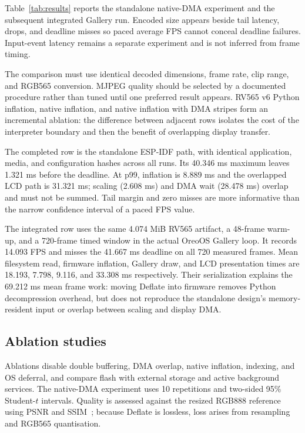 \documentclass[11pt,twocolumn]{article}
\begin{document}
Table~\ref{tab:results} reports the standalone native-DMA experiment and the
subsequent integrated Gallery run.  Encoded size appears beside tail latency,
drops, and deadline misses so paced average FPS cannot conceal deadline
failures.  Input-event latency remains a separate experiment and is not
inferred from frame timing.

The comparison must use identical decoded dimensions, frame rate, clip range,
and RGB565 conversion.  MJPEG quality should be selected by a documented
procedure rather than tuned until one preferred result appears.  RV565 v6
Python inflation, native inflation, and native inflation with DMA stripes form
an incremental ablation: the difference between adjacent rows isolates the
cost of the interpreter boundary and then the benefit of overlapping display
transfer.

The completed row is the standalone ESP-IDF path, with identical application,
media, and configuration hashes across all runs.  Its 40.346 ms maximum leaves
1.321 ms before the deadline.  At p99, inflation is 8.889 ms and the overlapped
LCD path is 31.321 ms; scaling (2.608 ms) and DMA wait (28.478 ms) overlap and
must not be summed.  Tail margin and zero misses are more informative than the
narrow confidence interval of a paced FPS value.

The integrated row uses the same 4.074 MiB RV565 artifact, a 48-frame warm-up,
and a 720-frame timed window in the actual OreoOS Gallery loop.  It records
14.093 FPS and misses the 41.667 ms deadline on all 720 measured frames.  Mean
filesystem read, firmware inflation, Gallery draw, and LCD presentation times
are 18.193, 7.798, 9.116, and 33.308 ms respectively.  Their serialization
explains the 69.212 ms mean frame work: moving Deflate into firmware removes
Python decompression overhead, but does not reproduce the standalone design's
memory-resident input or overlap between scaling and display DMA.

\subsection{Ablation studies}

Ablations disable double buffering, DMA overlap, native inflation, indexing,
and OS deferral, and compare flash with external storage and active background
services.  The native-DMA experiment uses 10 repetitions and two-sided 95\%
Student-$t$ intervals.  Quality is assessed against the resized RGB888
reference using PSNR and SSIM~\cite{wang2004image}; because Deflate is
lossless, loss arises from resampling and RGB565 quantisation.
\end{document}
